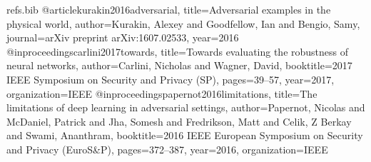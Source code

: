 \begin{filecontents}{refs.bib}
@article{kurakin2016adversarial,
  title={Adversarial examples in the physical world},
  author={Kurakin, Alexey and Goodfellow, Ian and Bengio, Samy},
  journal={arXiv preprint arXiv:1607.02533},
  year={2016}
}
@inproceedings{carlini2017towards,
  title={Towards evaluating the robustness of neural networks},
  author={Carlini, Nicholas and Wagner, David},
  booktitle={2017 IEEE Symposium on Security and Privacy (SP)},
  pages={39--57},
  year={2017},
  organization={IEEE}
}
@inproceedings{papernot2016limitations,
  title={The limitations of deep learning in adversarial settings},
  author={Papernot, Nicolas and McDaniel, Patrick and Jha, Somesh and Fredrikson, Matt and Celik, Z Berkay and Swami, Ananthram},
  booktitle={2016 IEEE European Symposium on Security and Privacy (EuroS\&P)},
  pages={372--387},
  year={2016},
  organization={IEEE}
}

\end{filecontents}

\documentclass[11pt,letterpaper]{article}

\usepackage[letterpaper,margin=0.8in,nohead]{geometry}

\usepackage[colorlinks]{hyperref}
\usepackage{url}
\usepackage{breakurl}


\usepackage{verbatim}
\usepackage{fancyvrb}
\usepackage{scrextend}
\usepackage{enumitem}
\usepackage{url}

\usepackage{filecontents}

\usepackage{caption}
\usepackage{graphicx}

\usepackage{changepage}   %

\newenvironment{answer}{\em \color{blue} \begin{adjustwidth}{1cm}{1cm}}{\end{adjustwidth}}

\usepackage{amsthm,amsmath}
\usepackage{amsfonts}

\newcommand{\mc}[1]{\mathcal{#1}}	%
\newcommand{\rv}[1]{\mathbf{#1}}    %

\newcommand{\pr}[1]{\mathrm{Pr}\{#1\}} %

\newtheorem{corollary}{\bf Corollary}%
\newtheorem{lemma}{\bf Lemma}%
\newtheorem{definition}{\bf Definition}%

